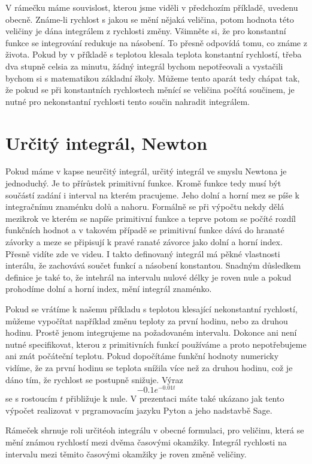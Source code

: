 \documentclass[12pt]{article}
\begin{document}
V rámečku máme souvislost, kterou jsme viděli v předchozím příkladě, uvedenu obecně. Známe-li rychlost s jakou se mění nějaká veličina, potom hodnota této veličiny je dána integrálem z rychlosti změny. Všimněte si, že pro konstantní funkce se integrování redukuje na násobení. To přesně odpovídá tomu, co známe z života. Pokud by v příkladě s teplotou klesala teplota konstantní rychlostí, třeba dva stupně celsia za minutu, žádný integrál bychom nepotřeovali a vystačili bychom si s matematikou základní školy. Můžeme tento aparát tedy chápat tak, že pokud se při konstantních rychlostech měnící se veličina počítá součinem, je nutné pro nekonstantní rychlosti tento součin nahradit integrálem.

\section*{Určitý integrál, Newton}

Pokud máme v kapse neurčitý integrál, určitý integrál ve smyslu Newtona je jednoduchý. Je to přírůstek primitivní funkce. Kromě funkce tedy musí být součástí zadání i interval na kterém pracujeme. Jeho dolní a horní mez se píše k integračnímu znaménku dolů a nahoru. Formálně se při výpočtu nekdy dělá mezikrok ve kterém se napíše primitivní funkce a teprve potom se počíté rozdíl funkčních hodnot a v takovém případě se primitivní funkce dává do hranaté závorky a meze se připisují k pravé ranaté závorce jako dolní a horní index. Přesně vidíte zde ve videu. I takto definovaný integrál má pěkné vlastnosti interálu, že zachovává součet funkcí a násobení konstantou. Snadným důsledkem definice je také to, že intehrál na intervalu nulové délky je roven nule a pokud prohodíme dolní a horní index, mění integrál znaménko. 

Pokud se vrátíme k našemu příkladu s teplotou klesající nekonstantní rychlostí, můžeme vypočítat například změnu teploty za první hodinu, nebo za druhou hodinu. Prostě jenom integrujeme na požadovaném intervalu. Dokonce ani není nutné specifikovat, kterou z primitivních funkcí používáme a proto nepotřebujeme ani znát počáteční teplotu. Pokud dopočítáme funkční hodnoty numericky vidíme, že za první hodinu se teplota snížila více než za druhou hodinu, což je dáno tím, že rychlost se postupně snižuje. Výraz $$-0.1 e^{-0.01t}$$ se s rostoucím $t$ přibližuje k nule. V prezentaci máte také ukázano jak tento výpočet realizovat v prgramovacím jazyku Pyton a jeho nadstavbě Sage.

Rámeček shrnuje roli určitéoh integrálu v obecné formulaci, pro veličinu, která se mění známou rychlostí mezi dvěma časovými okamžiky. Integrál rychlosti na intervalu mezi těmito časovými okamžiky je roven změně veličiny.
\end{document}
